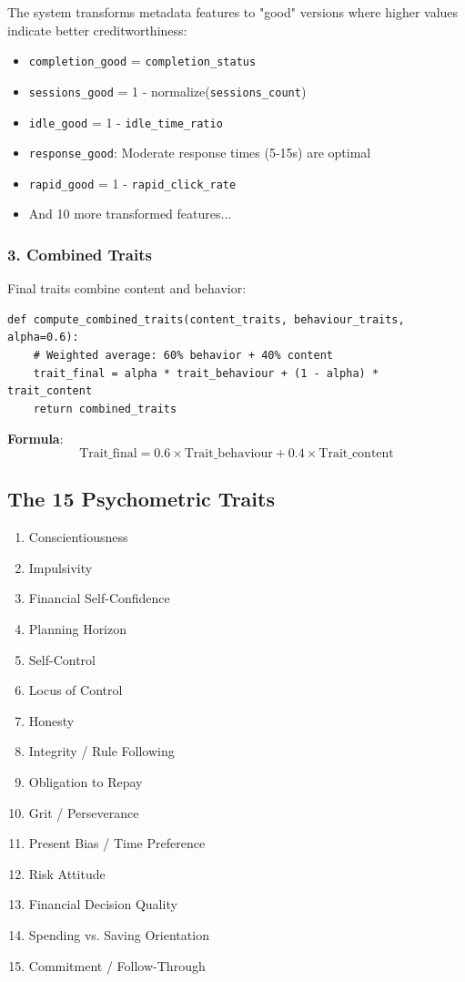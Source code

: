 \documentclass[11pt,a4paper]{article}
\begin{document}
The system transforms metadata features to "good" versions where higher values indicate better creditworthiness:
\begin{itemize}
    \item \texttt{completion\_good} = \texttt{completion\_status}
    \item \texttt{sessions\_good} = 1 - normalize(\texttt{sessions\_count})
    \item \texttt{idle\_good} = 1 - \texttt{idle\_time\_ratio}
    \item \texttt{response\_good}: Moderate response times (5-15s) are optimal
    \item \texttt{rapid\_good} = 1 - \texttt{rapid\_click\_rate}
    \item And 10 more transformed features...
\end{itemize}

\subsubsection{3. Combined Traits}
Final traits combine content and behavior:

\begin{lstlisting}[caption=Combined Trait Computation]
def compute_combined_traits(content_traits, behaviour_traits, alpha=0.6):
    # Weighted average: 60% behavior + 40% content
    trait_final = alpha * trait_behaviour + (1 - alpha) * trait_content
    return combined_traits
\end{lstlisting}

\textbf{Formula}:
\begin{equation}
\text{Trait\_final} = 0.6 \times \text{Trait\_behaviour} + 0.4 \times \text{Trait\_content}
\end{equation}

\subsection{The 15 Psychometric Traits}
\begin{enumerate}
    \item Conscientiousness
    \item Impulsivity
    \item Financial Self-Confidence
    \item Planning Horizon
    \item Self-Control
    \item Locus of Control
    \item Honesty
    \item Integrity / Rule Following
    \item Obligation to Repay
    \item Grit / Perseverance
    \item Present Bias / Time Preference
    \item Risk Attitude
    \item Financial Decision Quality
    \item Spending vs. Saving Orientation
    \item Commitment / Follow-Through
\end{enumerate}
\end{document}
